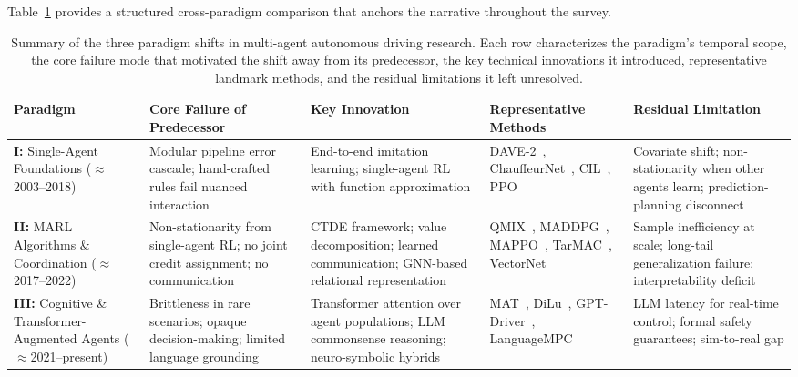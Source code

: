 \documentclass[12pt, a4paper]{article}
\begin{document}
Table~\ref{tab:paradigm_shift} provides a structured cross-paradigm comparison
that anchors the narrative throughout the survey.

\begin{table}[ht]
\centering
\caption{Summary of the three paradigm shifts in multi-agent autonomous driving research.
Each row characterizes the paradigm's temporal scope, the core failure mode that
motivated the shift away from its predecessor, the key technical innovations it
introduced, representative landmark methods, and the residual limitations it left
unresolved.
\label{tab:paradigm_shift}}
\renewcommand{\arraystretch}{1.3}
\small
\begin{tabular}{p{2.0cm}p{2.8cm}p{3.2cm}p{2.8cm}p{2.6cm}}
\toprule
\textbf{Paradigm} & \textbf{Core Failure of Predecessor} & \textbf{Key Innovation} &
\textbf{Representative Methods} & \textbf{Residual Limitation} \\
\midrule
\textbf{I:} Single-Agent Foundations ($\approx$2003--2018)
& Modular pipeline error cascade; hand-crafted rules fail nuanced interaction
& End-to-end imitation learning; single-agent RL with function approximation
& DAVE-2~\cite{bojarski2016end}, ChauffeurNet~\cite{bansal2018chauffeur}, CIL~\cite{codevilla2018end}, PPO~\cite{schulman2017proximal}
& Covariate shift; non-stationarity when other agents learn; prediction-planning disconnect \\
\addlinespace
\textbf{II:} MARL Algorithms \& Coordination ($\approx$2017--2022)
& Non-stationarity from single-agent RL; no joint credit assignment; no communication
& CTDE framework; value decomposition; learned communication; GNN-based relational representation
& QMIX~\cite{rashid2018qmix}, MADDPG~\cite{lowe2017multi}, MAPPO~\cite{yu2021surprising}, TarMAC~\cite{das2019tarmac}, VectorNet~\cite{gao2020vectornet}
& Sample inefficiency at scale; long-tail generalization failure; interpretability deficit \\
\addlinespace
\textbf{III:} Cognitive \& Transformer-Augmented Agents ($\approx$2021--present)
& Brittleness in rare scenarios; opaque decision-making; limited language grounding
& Transformer attention over agent populations; LLM commonsense reasoning; neuro-symbolic hybrids
& MAT~\cite{wen2022multi}, DiLu~\cite{wen2023dilu}, GPT-Driver~\cite{mao2023gpt}, LanguageMPC~\cite{sha2023languagempc}
& LLM latency for real-time control; formal safety guarantees; sim-to-real gap \\
\bottomrule
\end{tabular}
\end{table}
\end{document}
